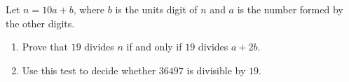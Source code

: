 Let $n=10a+b$, where $b$ is the units digit of $n$ and $a$ is the number formed by the other digits.
\begin{enumerate}
\item[(a)] Prove that $19$ divides $n$ if and only if $19$ divides $a+2b$.
\item[(b)] Use this test to decide whether $36497$ is divisible by $19$.
\end{enumerate}
